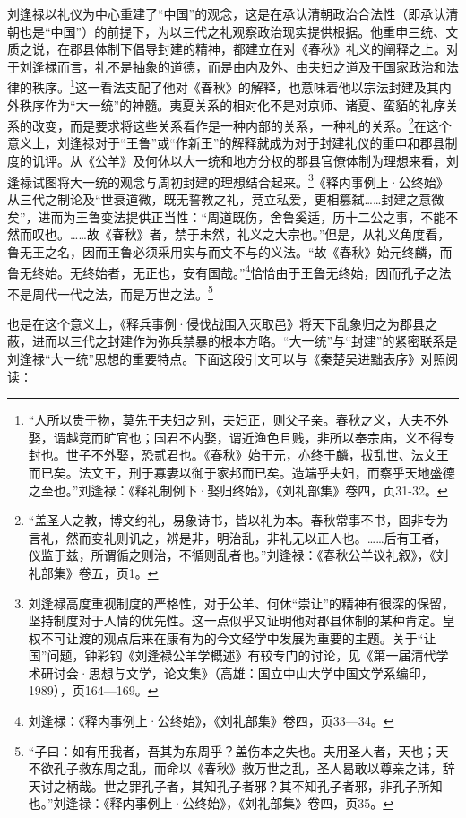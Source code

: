 \documentclass[a4paper, 12pt, openright]{ctexbook}
\begin{document}
刘逢禄以礼仪为中心重建了“中国”的观念，这是在承认清朝政治合法性（即承认清朝也是“中国”）的前提下，为以三代之礼观察政治现实提供根据。他重申三统、文质之说，在郡县体制下倡导封建的精神，都建立在对《春秋》礼义的阐释之上。对于刘逢禄而言，礼不是抽象的道德，而是由内及外、由夫妇之道及于国家政治和法律的秩序。\footnote{“人所以贵于物，莫先于夫妇之别，夫妇正，则父子亲。春秋之义，大夫不外娶，谓越竞而旷官也；国君不内娶，谓近渔色且贱，非所以奉宗庙，义不得专封也。世子不外娶，恐贰君也。《春秋》始于元，亦终于麟，拔乱世、法文王而已矣。法文王，刑于寡妻以御于家邦而已矣。造端乎夫妇，而察乎天地盛德之至也。”刘逢禄：《释礼制例下·娶归终始》，《刘礼部集》卷四，页31-32。}这一看法支配了他对《春秋》的解释，也意味着他以宗法封建及其内外秩序作为“大一统”的神髓。夷夏关系的相对化不是对京师、诸夏、蛮貊的礼序关系的改变，而是要求将这些关系看作是一种内部的关系，一种礼的关系。\footnote{“盖圣人之教，博文约礼，易象诗书，皆以礼为本。春秋常事不书，固非专为言礼，然而变礼则讥之，辨是非，明治乱，非礼无以正人也。……后有王者，仪监于兹，所谓循之则治，不循则乱者也。”刘逢禄：《春秋公羊议礼叙》，《刘礼部集》卷五，页1。}在这个意义上，刘逢禄对于“王鲁”或“作新王”的解释就成为对于封建礼仪的重申和郡县制度的讥评。从《公羊》及何休以大一统和地方分权的郡县官僚体制为理想来看，刘逢禄试图将大一统的观念与周初封建的理想结合起来。\footnote{刘逢禄高度重视制度的严格性，对于公羊、何休“崇让”的精神有很深的保留，坚持制度对于人情的优先性。这一点似乎又证明他对郡县体制的某种肯定。皇权不可让渡的观点后来在康有为的今文经学中发展为重要的主题。关于“让国”问题，钟彩钧《刘逢禄公羊学概述》有较专门的讨论，见《第一届清代学术研讨会·思想与文学，论文集》（高雄：国立中山大学中国文学系编印，1989），页164—169。}《释内事例上·公终始》从三代之制论及“世衰道微，既无誓教之礼，竞立私爱，更相篡弑……封建之意微矣”，进而为王鲁变法提供正当性：“周道既伤，舍鲁奚适，历十二公之事，不能不然而叹也。……故《春秋》者，禁于未然，礼义之大宗也。”但是，从礼义角度看，鲁无王之名，因而王鲁必须采用实与而文不与的义法。“故《春秋》始元终麟，而鲁无终始。无终始者，无正也，安有国哉。”\footnote{刘逢禄：《释内事例上·公终始》，《刘礼部集》卷四，页33—34。}恰恰由于王鲁无终始，因而孔子之法不是周代一代之法，而是万世之法。\footnote{“子曰：如有用我者，吾其为东周乎？盖伤本之失也。夫用圣人者，天也；天不欲孔子救东周之乱，而命以《春秋》救万世之乱，圣人曷敢以尊亲之讳，辞天讨之柄哉。世之罪孔子者，其知孔子者邪？其不知孔子者邪，非孔子所知也。”刘逢禄：《释内事例上·公终始》，《刘礼部集》卷四，页35。}

也是在这个意义上，《释兵事例·侵伐战围入灭取邑》将天下乱象归之为郡县之蔽，进而以三代之封建作为弥兵禁暴的根本方略。“大一统”与“封建”的紧密联系是刘逢禄“大一统”思想的重要特点。下面这段引文可以与《秦楚吴进黜表序》对照阅读：
\end{document}
